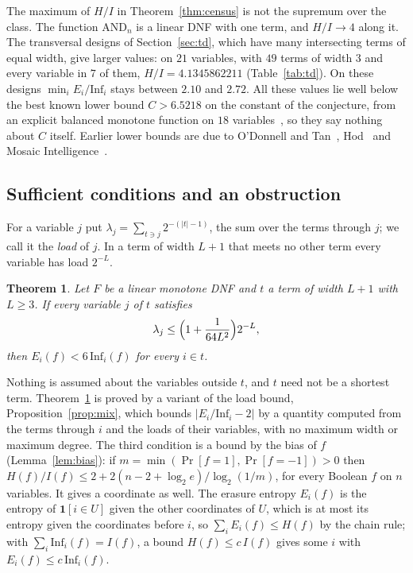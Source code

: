 \documentclass[11pt]{amsart}
\newtheorem{theorem}{Theorem}
\theoremstyle{remark}
\newcommand{\Inf}{\mathrm{Inf}}
\begin{document}
The maximum of $H/I$ in Theorem~\ref{thm:census} is not the supremum over the class. The function $\mathrm{AND}_n$ is a linear DNF
with one term, and $H/I\to4$ along it. The transversal designs of Section~\ref{sec:td}, which have many intersecting
terms of equal width, give larger values: on $21$ variables, with $49$ terms of width $3$ and every variable in $7$ of
them, $H/I=4.1345862211$ (Table~\ref{tab:td}). On these designs $\min_iE_i/\Inf_i$ stays between $2.10$ and $2.72$.
All these values lie well below the best known lower bound $C>6.5218$ on the constant of the conjecture, from an
explicit balanced monotone function on $18$ variables~\cite{Num26}, so they say nothing about $C$ itself. Earlier
lower bounds are due to O'Donnell and Tan~\cite{OT13}, Hod~\cite{Hod} and Mosaic Intelligence~\cite{MI26a,MI26b}.

\subsection{Sufficient conditions and an obstruction}
For a variable $j$ put $\lambda_j=\sum_{t\ni j}2^{-(|t|-1)}$, the sum over the terms through $j$; we call it the
\emph{load} of $j$. In a term of width $L+1$ that meets no other term every variable has load $2^{-L}$.

\begin{theorem}\label{thm:local}
Let $F$ be a linear monotone DNF and $t$ a term of width $L+1$ with $L\ge3$. If every variable $j$ of $t$ satisfies
\[
\lambda_j\le\Bigl(1+\frac1{64L^2}\Bigr)2^{-L},
\]
then $E_i(f)<6\,\Inf_i(f)$ for every $i\in t$.
\end{theorem}

Nothing is assumed about the variables outside $t$, and $t$ need not be a shortest term. Theorem~\ref{thm:local} is
proved by a variant of the load bound, Proposition~\ref{prop:mix}, which bounds $|E_i/\Inf_i-2|$ by a quantity computed
from the terms through $i$ and the loads of their variables, with no maximum width or maximum degree. The third
condition is a bound by the bias of $f$ (Lemma~\ref{lem:bias}): if $m=\min(\Pr[f=1],\Pr[f=-1])>0$ then
$H(f)/I(f)\le2+2(n-2+\log_2e)/\log_2(1/m)$, for every Boolean $f$ on $n$ variables. It gives a coordinate as well. The
erasure entropy $E_i(f)$ is the entropy of $\mathbf 1[i\in U]$ given the other coordinates of $U$, which is at most its
entropy given the coordinates before $i$, so $\sum_iE_i(f)\le H(f)$ by the chain rule; with $\sum_i\Inf_i(f)=I(f)$, a
bound $H(f)\le c\,I(f)$ gives some $i$ with $E_i(f)\le c\,\Inf_i(f)$.
\end{document}

